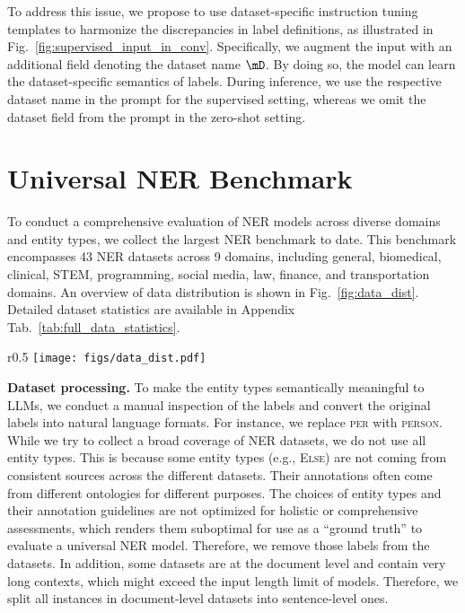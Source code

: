 To address this issue, we propose to use dataset-specific instruction tuning templates to harmonize the discrepancies in label definitions, as illustrated in Fig.~\ref{fig:supervised_input_in_conv}.
Specifically, we augment the input with an additional field denoting the dataset name $\mD$.
By doing so, the model can learn the dataset-specific semantics of labels.
During inference, we use the respective dataset name in the prompt for the supervised setting, whereas we omit the dataset field from the prompt in the zero-shot setting.
\section{Universal NER Benchmark}
To conduct a comprehensive evaluation of NER models across diverse domains and entity types, we collect the largest NER benchmark to date.
This benchmark encompasses 43 NER datasets across 9 domains, including general, biomedical, clinical, STEM, programming, social media, law, finance, and transportation domains.
An overview of data distribution is shown in Fig.~\ref{fig:data_dist}.
Detailed dataset statistics are available in Appendix Tab.~\ref{tab:full_data_statistics}.

\begin{wrapfigure}[22]{r}{0.5\textwidth}
    \vspace{-15pt}
    \centering
    \texttt{[image: figs/data\_dist.pdf]}
    \caption{Distribution of UniNER benchmark.}
    \label{fig:data_dist}
\end{wrapfigure}

\smallskip
\noindent\textbf{Dataset processing.} To make the entity types semantically meaningful to LLMs, we conduct a manual inspection of the labels and convert the original labels into natural language formats.
For instance, we replace \textsc{per} with \textsc{person}.
While we try to collect a broad coverage of NER datasets, we do not use all entity types.
This is because some entity types (e.g., \textsc{Else}) are not coming from consistent sources across the different datasets.
Their annotations often come from different ontologies for different purposes.
The choices of entity types and their annotation guidelines are not optimized for holistic or comprehensive assessments, which renders them suboptimal for use as a ``ground truth'' to evaluate a universal NER model.
Therefore, we remove those labels from the datasets.
In addition, some datasets are at the document level and contain very long contexts, which might exceed the input length limit of models.
Therefore, we split all instances in document-level datasets into sentence-level %
ones.
